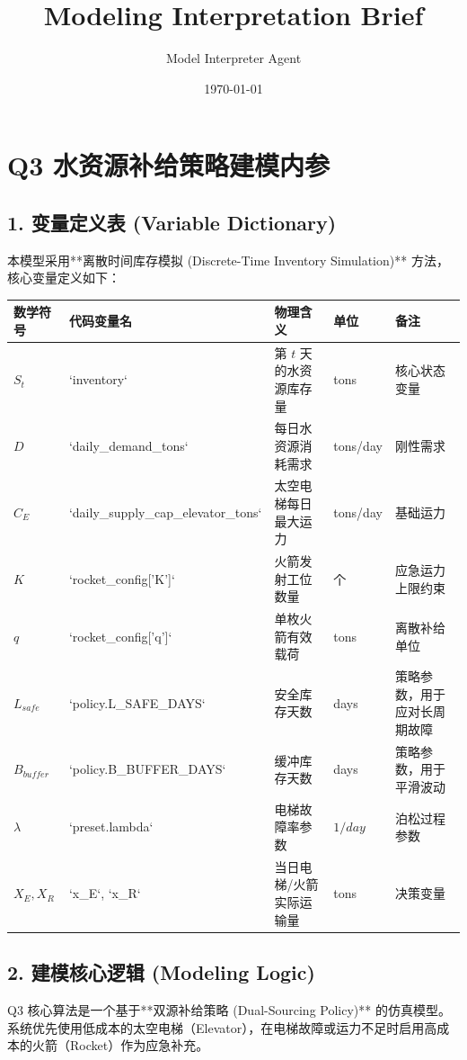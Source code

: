 \documentclass{article}
\title{Modeling Interpretation Brief}
\author{Model Interpreter Agent}
\date{\today}
\begin{document}
\maketitle
\section*{Q3 水资源补给策略建模内参}
\par
\subsection*{1. 变量定义表 (Variable Dictionary)}
\par
本模型采用**离散时间库存模拟 (Discrete-Time Inventory Simulation)** 方法，核心变量定义如下：
\par
\begin{center}
\begin{longtable}{lllll}
\toprule
数学符号 & 代码变量名 & 物理含义 & 单位 & 备注 \\
\midrule
$S_t$ & `inventory` & 第 $t$ 天的水资源库存量 & tons & 核心状态变量 \\
$D$ & `daily\_demand\_tons` & 每日水资源消耗需求 & tons/day & 刚性需求 \\
$C_E$ & `daily\_supply\_cap\_elevator\_tons` & 太空电梯每日最大运力 & tons/day & 基础运力 \\
$K$ & `rocket\_config['K']` & 火箭发射工位数量 & 个 & 应急运力上限约束 \\
$q$ & `rocket\_config['q']` & 单枚火箭有效载荷 & tons & 离散补给单位 \\
$L_{safe}$ & `policy.L\_SAFE\_DAYS` & 安全库存天数 & days & 策略参数，用于应对长周期故障 \\
$B_{buffer}$ & `policy.B\_BUFFER\_DAYS` & 缓冲库存天数 & days & 策略参数，用于平滑波动 \\
$\lambda$ & `preset.lambda` & 电梯故障率参数 & $1/day$ & 泊松过程参数 \\
$X_E, X_R$ & `x\_E`, `x\_R` & 当日电梯/火箭实际运输量 & tons & 决策变量 \\
\bottomrule
\end{longtable}
\end{center}
\par
\subsection*{2. 建模核心逻辑 (Modeling Logic)}
\par
Q3 核心算法是一个基于**双源补给策略 (Dual-Sourcing Policy)** 的仿真模型。系统优先使用低成本的太空电梯（Elevator），在电梯故障或运力不足时启用高成本的火箭（Rocket）作为应急补充。
\par
\end{document}
